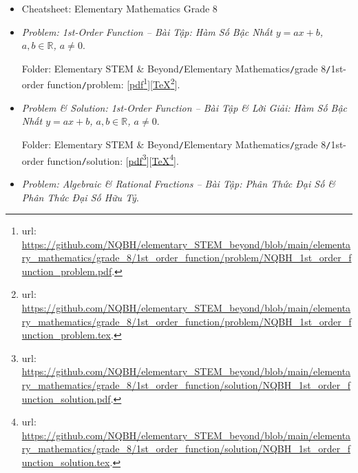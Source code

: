\documentclass[12pt]{article}
\begin{document}
\begin{itemize}
	\item Cheatsheet: Elementary Mathematics Grade 8
	\item {\it Problem: 1st-Order Function -- Bài Tập: Hàm Số Bậc Nhất $y = ax + b$, $a,b\in\mathbb{R}$, $a\ne0$}.
	
	Folder: {\sf Elementary STEM \& Beyond{\tt/}Elementary Mathematics{\tt/}grade 8{\tt/}1st-order function{\tt/}problem}: [\href{https://github.com/NQBH/elementary_STEM_beyond/blob/main/elementary_mathematics/grade_8/1st_order_function/problem/NQBH_1st_order_function_problem.pdf}{pdf}\footnote{{\sc url}: \url{https://github.com/NQBH/elementary_STEM_beyond/blob/main/elementary_mathematics/grade_8/1st_order_function/problem/NQBH_1st_order_function_problem.pdf}.}][\href{https://github.com/NQBH/elementary_STEM_beyond/blob/main/elementary_mathematics/grade_8/1st_order_function/problem/NQBH_1st_order_function_problem.tex}{\TeX}\footnote{{\sc url}: \url{https://github.com/NQBH/elementary_STEM_beyond/blob/main/elementary_mathematics/grade_8/1st_order_function/problem/NQBH_1st_order_function_problem.tex}.}].
	\item {\it Problem \& Solution: 1st-Order Function -- Bài Tập \& Lời Giải: Hàm Số Bậc Nhất $y = ax + b$, $a,b\in\mathbb{R}$, $a\ne0$}.
	
	Folder: {\sf Elementary STEM \& Beyond{\tt/}Elementary Mathematics{\tt/}grade 8{\tt/}1st-order function{\tt/}solution}: [\href{https://github.com/NQBH/elementary_STEM_beyond/blob/main/elementary_mathematics/grade_8/1st_order_function/solution/NQBH_1st_order_function_solution.pdf}{pdf}\footnote{{\sc url}: \url{https://github.com/NQBH/elementary_STEM_beyond/blob/main/elementary_mathematics/grade_8/1st_order_function/solution/NQBH_1st_order_function_solution.pdf}.}][\href{https://github.com/NQBH/elementary_STEM_beyond/blob/main/elementary_mathematics/grade_8/1st_order_function/solution/NQBH_1st_order_function_solution.tex}{\TeX}\footnote{{\sc url}: \url{https://github.com/NQBH/elementary_STEM_beyond/blob/main/elementary_mathematics/grade_8/1st_order_function/solution/NQBH_1st_order_function_solution.tex}.}].
	\item {\it Problem: Algebraic \& Rational Fractions -- Bài Tập: Phân Thức Đại Số \& Phân Thức Đại Số Hữu Tỷ}.
	

\end{itemize}
\end{document}
